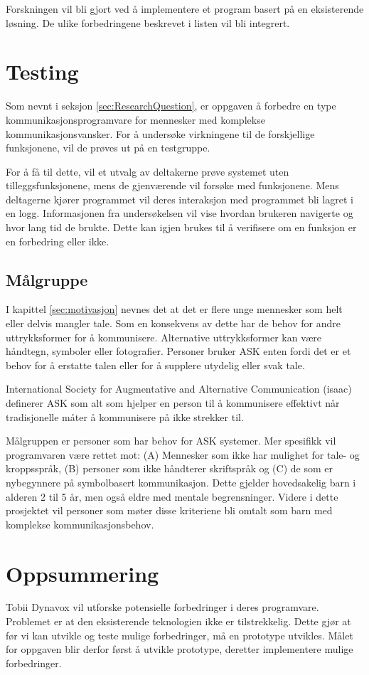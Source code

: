 Forskningen vil bli gjort ved å implementere et program basert på en eksisterende løsning. De ulike forbedringene beskrevet i listen vil bli integrert.

\section{Testing}

Som nevnt i seksjon \ref{sec:ResearchQuestion}, er oppgaven å forbedre en type kommunikasjonsprogramvare for mennesker med komplekse kommunikasjonsvansker. For å undersøke virkningene til de forskjellige funksjonene, vil de prøves ut på en testgruppe.

For å få til dette, vil et utvalg av deltakerne prøve systemet uten tilleggsfunksjonene, mens de gjenværende vil forsøke med funksjonene. Mens deltagerne kjører programmet vil deres interaksjon med programmet bli lagret i en logg. Informasjonen fra undersøkelsen vil vise hvordan brukeren navigerte og hvor lang tid de brukte. Dette kan igjen brukes til å verifisere om en funksjon er en forbedring eller ikke.

\subsection{Målgruppe}

I kapittel \ref{sec:motivasjon} nevnes det at det er flere unge mennesker som helt eller delvis mangler tale. Som en konsekvens av dette har de behov for andre uttrykksformer for å kommunisere. Alternative uttrykksformer kan være håndtegn, symboler eller fotografier. Personer bruker ASK enten fordi det er et behov for å erstatte talen eller for å supplere utydelig eller svak tale.

International Society for Augmentative and Alternative Communication (\gls{isaac}) \cite{HvaErASK} definerer ASK som alt som hjelper en person til å kommunisere effektivt når tradisjonelle måter å kommunisere på ikke strekker til.

Målgruppen er personer som har behov for ASK systemer. Mer spesifikk vil programvaren være rettet mot: (A) Mennesker som ikke har mulighet for tale- og kroppsspråk,  (B) personer som ikke håndterer skriftspråk og (C) de som er nybegynnere på symbolbasert kommunikasjon. Dette gjelder hovedsakelig barn i alderen 2 til 5 år, men også eldre med mentale begrensninger. Videre i dette prosjektet vil personer som møter disse kriteriene bli omtalt som barn med komplekse kommunikasjonsbehov. 


\section{Oppsummering}

Tobii Dynavox vil utforske potensielle forbedringer i deres programvare. Problemet er at den eksisterende teknologien ikke er tilstrekkelig. Dette gjør at før vi kan utvikle og teste mulige forbedringer, må en prototype utvikles. Målet for oppgaven blir derfor først å utvikle prototype, deretter implementere mulige forbedringer.